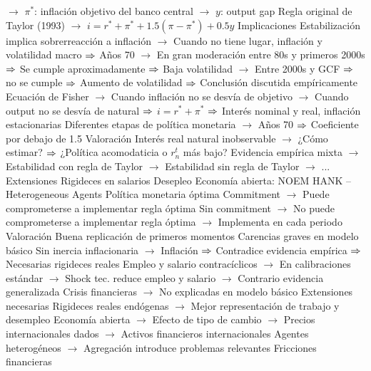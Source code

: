 \documentclass{nuevotema}
\begin{document}
\begin{esquemal}
				\4[] $\to$ $\pi^*$: inflación objetivo del banco central
				\4[] $\to$ $y$: output gap
				\4[] Regla original de Taylor (1993)
				\4[] $\to$ $i = r^* + \pi^* + 1.5(\pi - \pi^*) + 0.5 y$
				\4 Implicaciones
				\4[] Estabilización implica sobrerreacción a inflación
				\4[] $\to$ Cuando no tiene lugar, inflación y volatilidad macro
				\4[] $\Rightarrow$ Años 70
				\4[] $\to$ En gran moderación entre 80s y primeros 2000s
				\4[] $\Rightarrow$ Se cumple aproximadamente
				\4[] $\Rightarrow$ Baja volatilidad
				\4[] $\to$ Entre 2000s y GCF
				\4[] $\Rightarrow$ no se cumple
				\4[] $\Rightarrow$ Aumento de volatilidad
				\4[] $\Rightarrow$ Conclusión discutida empíricamente
				\4[] Ecuación de Fisher
				\4[] $\to$ Cuando inflación no se desvía de objetivo
				\4[] $\to$ Cuando output no se desvía de natural
				\4[] $\Rightarrow$ $i=r^* + \pi^*$
				\4[] $\Rightarrow$ Interés nominal y real, inflación estacionarias
				\4[] Diferentes etapas de política monetaria
				\4[] $\to$ Años 70
				\4[] $\Rightarrow$ Coeficiente por debajo de 1.5
				\4 Valoración
				\4[] Interés real natural inobservable
				\4[] $\to$ ¿Cómo estimar?
				\4[] $\Rightarrow$ ¿Política acomodaticia o $r_n^t$ más bajo?
				\4[] Evidencia empírica mixta
				\4[] $\to$ Estabilidad con regla de Taylor
				\4[] $\to$ Estabilidad sin regla de Taylor
				\4[] $\to$ ...
			\3 Extensiones
				\4 Rigideces en salarios
				\4 Desepleo
				\4 Economía abierta: NOEM
				\4 HANK -- Heterogeneous Agents
				\4 Política monetaria óptima
				\4[] Commitment
				\4[] $\to$ Puede comprometerse a implementar regla óptima
				\4[] Sin commitment
				\4[] $\to$ No puede comprometerse a implementar regla óptima
				\4[] $\to$ Implementa en cada periodo
			\3 Valoración
				\4 Buena replicación de primeros momentos
				\4 Carencias graves en modelo básico
				\4[] Sin inercia inflacionaria
				\4[] $\to$ Inflación
				\4[] $\Rightarrow$ Contradice evidencia empírica
				\4[] $\Rightarrow$ Necesarias rigideces reales
				\4[] Empleo y salario contracíclicos
				\4[] $\to$ En calibraciones estándar
				\4[] $\to$ Shock tec. reduce empleo y salario
				\4[] $\to$ Contrario evidencia generalizada
				\4[] Crisis financieras
				\4[] $\to$ No explicadas en modelo básico
				\4 Extensiones necesarias
				\4[] Rigideces reales endógenas
				\4[] $\to$ Mejor representación de trabajo y desempleo
				\4[] Economía abierta
				\4[] $\to$ Efecto de tipo de cambio
				\4[] $\to$ Precios internacionales dados
				\4[] $\to$ Activos financieros internacionales
				\4[] Agentes heterogéneos
				\4[] $\to$ Agregación introduce problemas relevantes
				\4[] Fricciones financieras

\end{esquemal}
\end{document}
